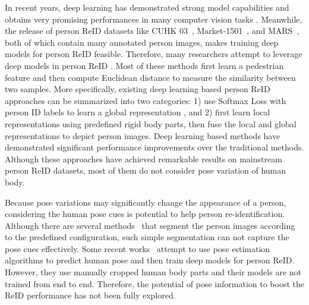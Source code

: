 \documentclass[10pt,twocolumn,letterpaper]{article}
\begin{document}
In recent years, deep learning has demonstrated strong model capabilities and obtains very promising performances in many computer vision tasks \cite{Krizhevsky:NIPS12, Girshick:PAMI15, long2015fully, CVPR15FaceNet, deng2013fine}. Meanwhile, the release of person ReID datasets like CUHK 03~\cite{li2014deepreid}, Market-1501~\cite{zheng2015scalable}, and MARS~\cite{zheng2016mars}, both of which contain many annotated person images, makes training deep models for person ReID feasible. Therefore, many researchers attempt to leverage deep models in person ReID \cite{ahmed5improved, ding2015deep, xiao2016learning, varior2016gated, su2016deep, zheng2016mars, geng2016deep, yaolarge, su2017multiType, yao2017deep}. Most of these methods first learn a pedestrian feature and then compute Euclidean distance to measure the similarity between two samples. More specifically, existing deep learning based person ReID approaches can be summarized into two categories: 1) use Softmax Loss with person ID labels to learn a global representation \cite{ahmed5improved, ding2015deep, xiao2016learning, varior2016gated, su2016deep, zheng2016mars, geng2016deep}, and 2) first learn local representations using predefined rigid body parts, then fuse the local and global representations \cite{cheng2016person, varior2016siamese, shi2016embedding} to depict person images. Deep learning based methods have demonstrated significant performance improvements over the traditional methods. Although these approaches have achieved remarkable results on mainstream person ReID datasets, most of them do not consider pose variation of human body.

Because pose variations may significantly change the appearance of a person, considering the human pose cues is potential to help person re-identification. Although there are several methods~\cite{cheng2016person, varior2016siamese, shi2016embedding} that segment the person images according to the predefined configuration, such simple segmentation can not capture the pose cues effectively. Some recent works~\cite{zheng2017pose, zhao2017spindle} attempt to use pose estimation algorithms to predict human pose and then train deep models for person ReID. However, they use manually cropped human body parts and their models are not trained from end to end. Therefore, the potential of pose information to boost the ReID performance has not been fully explored.
\end{document}
